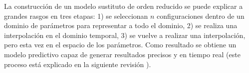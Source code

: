 La construcción de un modelo sustituto de orden reducido se puede explicar a grandes rasgos en tres etapas: 1) se seleccionan $n$ configuraciones dentro de un dominio de parámetros para representar a todo el dominio, 2) se realiza una interpolación en el dominio temporal, 3) se vuelve a realizar una interpolación, pero esta vez en el espacio de los parámetros. Como resultado se obtiene un modelo predictivo capaz de generar resultados precisos y en tiempo real (este proceso está explicado en la siguiente revisión \cite{Tiglio:2021ysj}).




